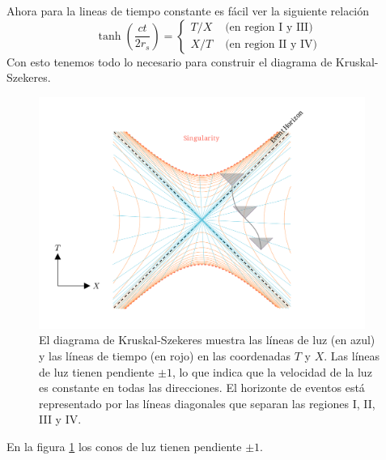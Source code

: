 \noindent Ahora para la lineas de tiempo constante es fácil ver la siguiente relación
\begin{equation}
    \tanh \left(\frac{ct}{2 r_s}\right)=\left\{\begin{array}{ll}
        T / X & \text { (en region I y III) } \\
        X / T & \text { (en region II y IV) }
    \end{array}\right.
\end{equation}
Con esto tenemos todo lo necesario para construir el diagrama de Kruskal-Szekeres.
\begin{figure}[H]
    \begin{small}
        \begin{center}
            \includegraphics[width=0.95\textwidth]{AgujerosNegros/Schwarzschild/media/images/Kruskal_Szekeres_diagram3_ManimCE_v0.19.0.png}
        \end{center}
        \caption{El diagrama de Kruskal-Szekeres muestra las líneas de luz (en azul) y las líneas de tiempo (en rojo) en las coordenadas \(T\) y \(X\). Las líneas de luz tienen pendiente \(\pm 1\), lo que indica que la velocidad de la luz es constante en todas las direcciones. El horizonte de eventos está representado por las líneas diagonales que separan las regiones I, II, III y IV.}
        \label{fig:Kruskal_Szekeres_diagram}
    \end{small}
\end{figure}
En la figura \ref{fig:Kruskal_Szekeres_diagram} los conos de luz tienen pendiente \(\pm 1\).




